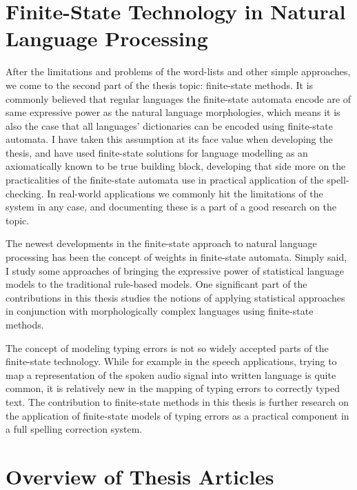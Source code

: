 \documentclass[officiallayout,draft]{unihelcompling}
\begin{document}
\section{Finite-State Technology in Natural Language Processing}
\label{sec:finite-state-technology-in-nlp}

After the limitations and problems of the word-lists and other simple
approaches, we come to the second part of the thesis topic: finite-state
methods.  It is commonly believed that regular languages the finite-state
automata encode are of same expressive power as the natural language
morphologies, which means it is also the case that all languages' dictionaries
can be encoded using finite-state automata. I have taken this assumption at its
face value when developing the thesis, and have used finite-state solutions for
language modelling as an axiomatically known to be true building block,
developing that side more on the practicalities of the finite-state automata
use in practical application of the spell-checking. In real-world applications
we commonly hit the limitations of the system in any case, and documenting
these is a part of a good research on the topic.

The newest developments in the finite-state approach to natural language
processing has been the concept of weights in finite-state automata.  Simply
said, I study some approaches of bringing the expressive power of statistical
language models to the traditional rule-based models. One significant part of
the contributions in this thesis studies the notions of applying statistical
approaches in conjunction with morphologically complex languages using
finite-state methods.

The concept of modeling typing errors is not so widely accepted parts of the
finite-state technology. While for example in the speech applications, trying
to map a representation of the spoken audio signal into written language is
quite common, it is relatively new in the mapping of typing errors to correctly
typed text. The contribution to finite-state methods in this thesis is further
research on the application of finite-state models of typing errors as
a practical component in a full spelling correction system.


\section{Overview of Thesis Articles}
\label{sec:articles}
\end{document}
